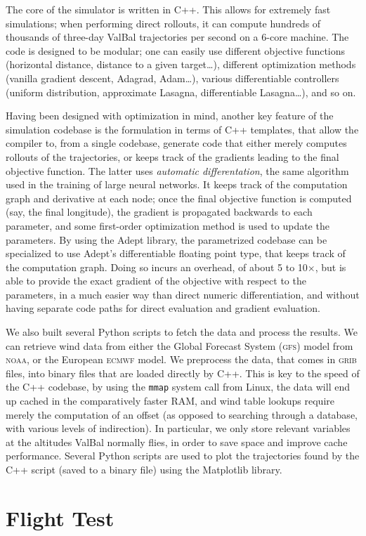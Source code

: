 \documentclass[11pt]{scrartcl} %
\begin{document}
The core of the simulator is written in C++. This allows for extremely fast simulations; when performing direct rollouts, it can compute hundreds of thousands of three-day ValBal trajectories per second on a 6-core machine. The code is designed to be modular; one can easily use different objective functions (horizontal distance, distance to a given target\dots), different optimization methods (vanilla gradient descent, Adagrad, Adam\dots), various differentiable controllers (uniform distribution, approximate Lasagna, differentiable Lasagna\dots), and so on.

Having been designed with optimization in mind, another key feature of the simulation codebase is the formulation in terms of C++ templates, that allow the compiler to, from a single codebase, generate code that either merely computes rollouts of the trajectories, or keeps track of the gradients leading to the final objective function. The latter uses \emph{automatic differentation}, the same algorithm used in the training of large neural networks. It keeps track of the computation graph and derivative at each node; once the final objective function is computed (say, the final longitude), the gradient is propagated backwards to each parameter, and some first-order optimization method is used to update the parameters. By using the Adept library, the parametrized codebase can be specialized to use Adept's differentiable floating point type, that keeps track of the computation graph. Doing so incurs an overhead, of about 5 to 10$\times$, but is able to provide the exact gradient of the objective with respect to the parameters, in a much easier way than direct numeric differentiation, and without having separate code paths for direct evaluation and gradient evaluation.

We also built several Python scripts to fetch the data and process the results. We can retrieve wind data from either the Global Forecast System (\textsc{gfs}) model from \textsc{noaa}, or the European \textsc{ecmwf} model. We preprocess the data, that comes in \textsc{grib} files, into binary files that are loaded directly by C++. This is key to the speed of the C++ codebase, by using the \texttt{mmap} system call from Linux, the data will end up cached in the comparatively faster RAM, and wind table lookups require merely the computation of an offset (as opposed to searching through a database, with various levels of indirection). In particular, we only store relevant variables at the altitudes ValBal normally flies, in order to save space and improve cache performance. Several Python scripts are used to plot the trajectories found by the C++ script (saved to a binary file) using the Matplotlib library.


\section{Flight Test}
\end{document}
